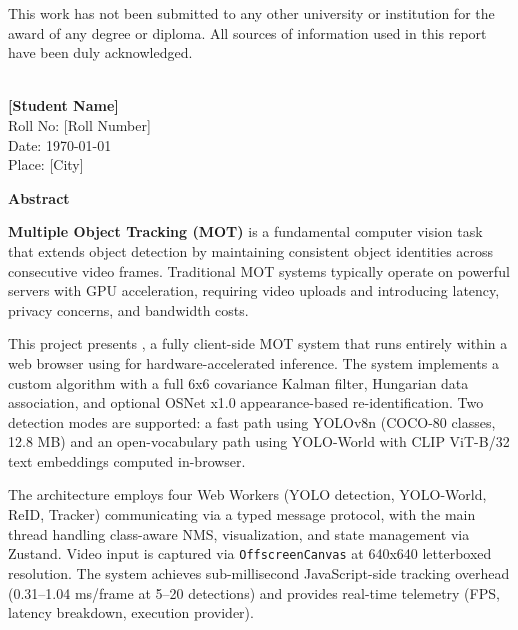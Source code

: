 \vspace{1cm}

\noindent This work has not been submitted to any other university or institution for the award of any degree or diploma. All sources of information used in this report have been duly acknowledged.

\vspace{2cm}

\noindent \hrulefill \\
\textbf{[Student Name]} \\
Roll No: [Roll Number] \\
Date: \today \\
Place: [City]

\newpage

\thispagestyle{plain}
\begin{center}
    {\Large \bfseries \color{trackvisiondark} Abstract}\\[1cm]
\end{center}

\vspace{1cm}

\noindent \textbf{Multiple Object Tracking (MOT)} is a fundamental computer vision task that extends object detection by maintaining consistent object identities across consecutive video frames. Traditional MOT systems typically operate on powerful servers with GPU acceleration, requiring video uploads and introducing latency, privacy concerns, and bandwidth costs.

\vspace{0.5cm}

\noindent This project presents \trackvision, a fully client-side MOT system that runs entirely within a web browser using \onnxweb for hardware-accelerated inference. The system implements a custom \bytetrack algorithm with a full 6x6 covariance Kalman filter, Hungarian data association, and optional OSNet x1.0 appearance-based re-identification. Two detection modes are supported: a fast path using YOLOv8n (COCO-80 classes, 12.8 MB) and an open-vocabulary path using YOLO-World with CLIP ViT-B/32 text embeddings computed in-browser.

\vspace{0.5cm}

\noindent The architecture employs four Web Workers (YOLO detection, YOLO-World, ReID, Tracker) communicating via a typed message protocol, with the main thread handling class-aware NMS, visualization, and state management via Zustand. Video input is captured via \texttt{OffscreenCanvas} at 640x640 letterboxed resolution. The system achieves sub-millisecond JavaScript-side tracking overhead (0.31--1.04 ms/frame at 5--20 detections) and provides real-time telemetry (FPS, latency breakdown, execution provider).

